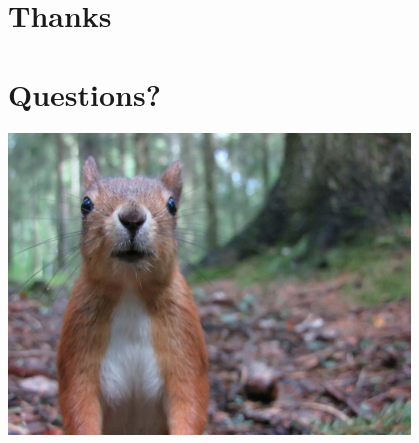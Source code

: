 \documentclass[xcolor=svgnames]{beamer}
\begin{document}
\section{Thanks}

    \begin{frame}
    \end{frame}

\section{Questions?}

    \begin{frame}
        \begin{center}
            \includegraphics[width=0.8\textwidth]{img/questions}
        \end{center}
    \end{frame}
\end{document}
